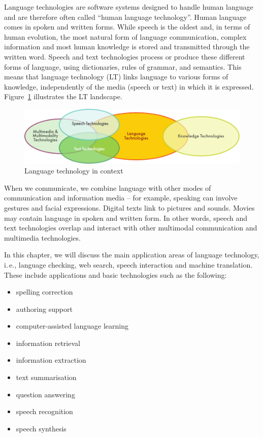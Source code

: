 \begin{multicols}{2}

Language technologies are software systems designed to handle human language and are therefore often called “human language technology”. Human language comes in spoken and written forms. While speech is the oldest and, in terms of human evolution, the most natural form of language communication, complex information and most human knowledge is stored and transmitted through the written word. Speech and text technologies process or produce these different forms of language, using dictionaries, rules of grammar, and semantics. This means that language technology (LT) links language to various forms of knowledge, independently of the media (speech or text) in which it is expressed. Figure~\ref{fig:ltincontext_en} illustrates the LT landscape.

\begin{figure}[htb]
  \center
  \includegraphics[width=\textwidth]{../_media/english/language_technologies}
  \caption{Language technology in context}
  \label{fig:ltincontext_en}
\end{figure}

When we communicate, we combine language with other modes of communication and information media -- for example, speaking can involve gestures and facial expressions. Digital texts link to pictures and sounds. Movies may contain language in spoken and written form. In other words, speech and text technologies overlap and interact with other multimodal communication and multimedia technologies.

In this chapter, we will discuss the main application areas of language technology, i.\,e., language checking, web search, speech interaction and machine translation. These include applications and basic technologies such as the following:

\begin{itemize}
\item spelling correction
\item authoring support
\item computer-assisted language learning
\item information retrieval 
\item information extraction
\item text summarisation
\item question answering
\item speech recognition 
\item speech synthesis 
\end{itemize}


\end{multicols}
